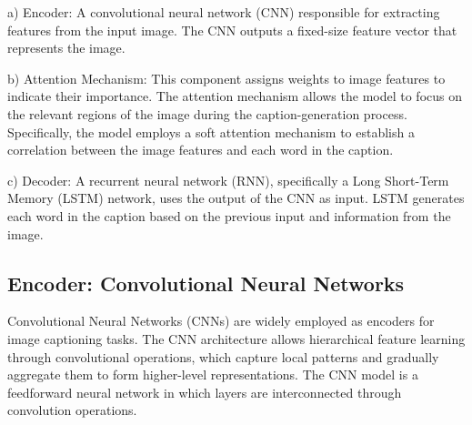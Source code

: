 \documentclass[conference]{IEEEtran}
\begin{document}
a) Encoder: A convolutional neural network (CNN) responsible for extracting features from the input image. The CNN outputs a fixed-size feature vector that represents the image.


b) Attention Mechanism: This component assigns weights to image features to indicate their importance. The attention mechanism allows the model to focus on the relevant regions of the image during the caption-generation process. Specifically, the model employs a soft attention mechanism to establish a correlation between the image features and each word in the caption.


c) Decoder: A recurrent neural network (RNN), specifically a Long Short-Term Memory (LSTM) network, uses the output of the CNN as input. LSTM generates each word in the caption based on the previous input and information from the image.


\subsection{Encoder: Convolutional Neural Networks\label{subsec:encoder}}
Convolutional Neural Networks (CNNs) are widely employed as encoders for image captioning tasks. The CNN architecture allows hierarchical feature learning through convolutional operations, which capture local patterns and gradually aggregate them to form higher-level representations. The CNN model is a feedforward neural network in which layers are interconnected through convolution operations. 


\end{document}
